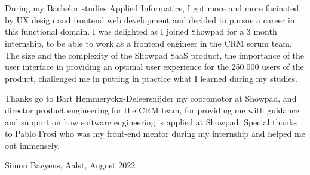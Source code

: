 
\chapter*{}
\label{ch:voorwoord}


During my Bachelor studies Applied Informatics, I got more and more facinated by UX design and frontend web development and decided to pursue a career in this functional domain. I was delighted as I joined Showpad for a 3 month internship, to be able to work as a frontend engineer in the CRM scrum team. The size and the complexity of the Showpad SaaS product, the importance of the user interface in providing an optimal user experience for the 250.000 users of the product, challenged me in putting in practice what I learned during my studies.

Thanks go to Bart Hemmeryckx-Deleersnijder my copromotor at Showpad, and director product engineering for the CRM team, for providing me with guidance and support on how software engineering is applied at Showpad. Special thanks to Pablo Frosi who was my front-end mentor during my internship and helped me out immensely.

Simon Baeyens, Aalst, August 2022